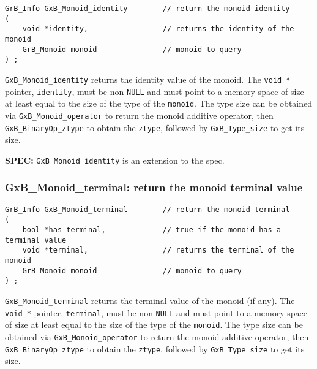 \documentclass[12pt]{article}
\begin{document}
\begin{mdframed}[userdefinedwidth=6in]
{\footnotesize
\begin{verbatim}
GrB_Info GxB_Monoid_identity        // return the monoid identity
(
    void *identity,                 // returns the identity of the monoid
    GrB_Monoid monoid               // monoid to query
) ;
\end{verbatim}
} \end{mdframed}

\verb'GxB_Monoid_identity' returns the identity value of the monoid.  The
\verb'void *' pointer, \verb'identity', must be non-\verb'NULL' and must point
to a memory space of size at least equal to the size of the type of the
\verb'monoid'.  The type size can be obtained via \verb'GxB_Monoid_operator' to
return the monoid additive operator, then \verb'GxB_BinaryOp_ztype' to obtain
the \verb'ztype', followed by \verb'GxB_Type_size' to get its size.

\begin{spec}
{\bf SPEC:} \verb'GxB_Monoid_identity' is an extension to the spec.
\end{spec}

\subsubsection{{\sf GxB\_Monoid\_terminal:} return the monoid terminal value}

\begin{mdframed}[userdefinedwidth=6in]
{\footnotesize
\begin{verbatim}
GrB_Info GxB_Monoid_terminal        // return the monoid terminal
(
    bool *has_terminal,             // true if the monoid has a terminal value
    void *terminal,                 // returns the terminal of the monoid
    GrB_Monoid monoid               // monoid to query
) ;
\end{verbatim}
} \end{mdframed}

\verb'GxB_Monoid_terminal' returns the terminal value of the monoid (if any).
The \verb'void *' pointer, \verb'terminal', must be non-\verb'NULL' and must
point to a memory space of size at least equal to the size of the type of the
\verb'monoid'.  The type size can be obtained via \verb'GxB_Monoid_operator' to
return the monoid additive operator, then \verb'GxB_BinaryOp_ztype' to obtain
the \verb'ztype', followed by \verb'GxB_Type_size' to get its size.
\end{document}
